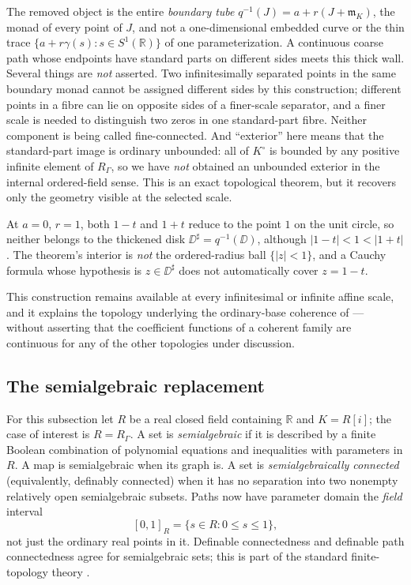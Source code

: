 \documentclass[11pt,letterpaper]{article}
\theoremstyle{definition}
\theoremstyle{remark}
\newcommand{\R}{\mathbb R}\newcommand{\C}{\mathbb C}\newcommand{\Q}{\mathbb Q}
\newcommand{\m}{\mathfrak m}\newcommand{\st}{\operatorname{st}}
\newcommand{\sh}{^{\sharp}}\newcommand{\dd}{\,d}
\numberwithin{equation}{section}
\begin{document}
The removed object is the entire \emph{boundary tube}
$q^{-1}(J)=a+r(J+\m_K)$, the monad of every point of $J$, and not a
one-dimensional embedded curve or the thin trace $\{a+r\gamma(s):s\in S^1(\R)\}$ of
one parameterization. A continuous coarse path whose endpoints have standard parts
on different sides meets this thick wall. Several things are \emph{not} asserted.
Two infinitesimally separated points in the same boundary monad cannot be assigned
different sides by this construction; different points in a fibre can lie on
opposite sides of a finer-scale separator, and a finer scale is needed to
distinguish two zeros in one standard-part fibre. Neither component is being called
fine-connected. And ``exterior'' here means that the standard-part image is
ordinary unbounded: all of $K^\circ$ is bounded by any positive infinite element of
$R_\Gamma$, so we have \emph{not} obtained an unbounded exterior in the internal
ordered-field sense. This is an exact topological theorem, but it recovers only the
geometry visible at the selected scale.

\begin{example}
\label{contours:ex:boundarylayer}
At $a=0$, $r=1$, both $1-t$ and $1+t$ reduce to the point $1$ on the unit circle,
so neither belongs to the thickened disk $\DD\sh=q^{-1}(\DD)$, although
$|1-t|<1<|1+t|$. The theorem's interior is \emph{not} the ordered-radius ball
$\{|z|<1\}$, and a Cauchy formula whose hypothesis is $z\in\DD\sh$ does not
automatically cover $z=1-t$.
\end{example}

This construction remains available at every infinitesimal or infinite affine
scale, and it explains the topology underlying the ordinary-base coherence of
\cite{Analysis} --- without asserting that the coefficient functions of a coherent
family are continuous for any of the other topologies under discussion.

\subsection{The semialgebraic replacement}
For this subsection let $R$ be a real closed field containing $\R$ and $K=R[i]$;
the case of interest is $R=R_\Gamma$. A set is \emph{semialgebraic} if it is
described by a finite Boolean combination of polynomial equations and inequalities
with parameters in $R$. A map is semialgebraic when its graph is. A set is
\emph{semialgebraically connected} (equivalently, definably connected) when it has
no separation into two nonempty relatively open semialgebraic subsets. Paths now
have parameter domain the \emph{field} interval
\[
  [0,1]_R=\{s\in R:0\le s\le1\},
\]
not just the ordinary real points in it. Definable connectedness and definable path
connectedness agree for semialgebraic sets; this is part of the standard
finite-topology theory \cite{BCR,BOhomology}.
\end{document}
